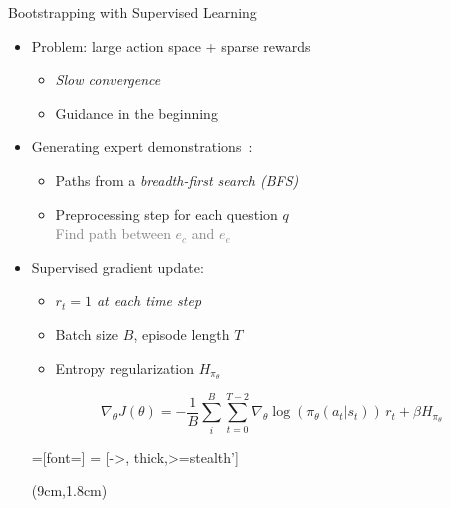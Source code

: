 \documentclass[table]{beamer}
\begin{document}
\begin{frame}{Bootstrapping with Supervised Learning}

\begin{itemize}
  \item Problem: large action space + sparse rewards
  \begin{itemize}
    \item \emph{Slow convergence}
    \item Guidance in the beginning
  \end{itemize}
  \item<2-> Generating expert demonstrations~{\scriptsize\cite{Xiong2017DeePpath}}:
  \begin{itemize}
    \item Paths from a \emph{breadth-first search (BFS)}
    \item Preprocessing step for each question $q$\\\textcolor{gray}{Find path between $e_c$ and $e_e$}
  \end{itemize}
  \item<3-> Supervised gradient update:
  \begin{itemize}
    \item \emph{$r_t = 1$ at each time step}
    \item Batch size $B$, episode length $T$
    \item Entropy regularization $H_{\pi_{\theta}}$
  \end{itemize}

    \begin{equation*}
      \nabla_{\theta} J(\theta) = - \frac{1}{B} \sum_{i}^{B} \sum_{t=0}^{T-2} \nabla_{\theta} \log(\pi_{\theta} (a_t | s_t)) \, r_t + \beta H_{\pi_\theta}
    \end{equation*}

  \tikzset{>=triangle 45}
  \tikzset{every picture/.style=thick}
  =[font=\small]
     = [->, thick,>=stealth']

  \begin{textblock*}{5cm}(9cm,1.8cm) 
\end{textblock*}
\end{itemize}
\end{frame}
\end{document}
